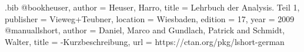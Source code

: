 
\begin{filecontents*}[overwrite]{\jobname.bib}
@book{heuser,
  author    = {Heuser, Harro},
  title     = {Lehrbuch der Analysis. Teil 1},
  publisher = {Vieweg+Teubner},
  location  = {Wiesbaden},
  edition   = {17},
  year      = {2009}
}
@manual{lshort,
  author = {Daniel, Marco and Gundlach, Patrick and Schmidt, Walter},
  title  = {\LaTeXe-Kurzbeschreibung},
  url    = {https://ctan.org/pkg/lshort-german}
}
\end{filecontents*}


\documentclass[%
	,ngerman				%
	,fontsize	= 11pt		%
	,parskip	= half		%
	]{scrartcl}

